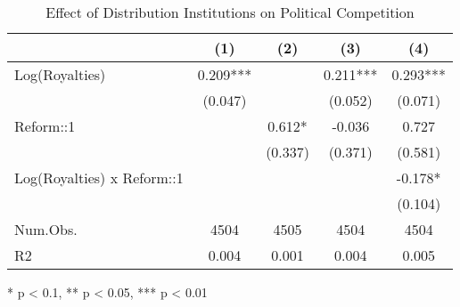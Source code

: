 \begin{table}[t]
\caption*{
{\large Effect of Distribution Institutions on Political Competition}
} 
\fontsize{12.0pt}{14.4pt}\selectfont
\begin{tabular*}{\linewidth}{@{\extracolsep{\fill}}lcccc}
\toprule
  & (1) & (2) & (3) & (4) \\ 
\midrule\addlinespace[2.5pt]
Log(Royalties) & 0.209*** &  & 0.211*** & 0.293*** \\ 
 & (0.047) &  & (0.052) & (0.071) \\ 
Reform::1 &  & 0.612* & -0.036 & 0.727 \\ 
 &  & (0.337) & (0.371) & (0.581) \\ 
Log(Royalties) x Reform::1 &  &  &  & -0.178* \\ 
{} & {} & {} & {} & {(0.104)} \\ 
Num.Obs. & 4504 & 4505 & 4504 & 4504 \\ 
R2 & 0.004 & 0.001 & 0.004 & 0.005 \\ 
\bottomrule
\end{tabular*}
\begin{minipage}{\linewidth}
* p < 0.1, ** p < 0.05, *** p < 0.01\\
\end{minipage}
\end{table}
